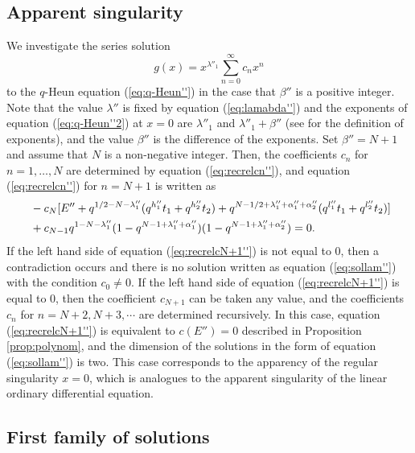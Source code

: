 \documentclass[12pt]{amsart}
\numberwithin{equation}{section}
\theoremstyle{definition}
\theoremstyle{remark}
\begin{document}
\subsection{Apparent singularity} \label{sec:appsing}
We investigate the series solution
\begin{equation}
g(x) = x^{\lambda ''_{1}} \sum_{n =0}^{\infty } c_{n} x^{n}  \label{eq:sollam''}
\end{equation}
to the $q$-Heun equation (\ref{eq:q-Heun''}) in the case that $\beta '' $ is a positive integer.
Note that the value $\lambda ''$ is fixed by equation (\ref{eq:lamabda''}) and the exponents of equation (\ref{eq:q-Heun''2}) at $x=0$ are $\lambda ''_{1} $ and $\lambda ''_{1} +\beta ''$ (see \cite{TakqH} for the definition of exponents), and the value $\beta ''  $ is the difference of the exponents.
Set $\beta '' =N+1$ and assume that $N$ is a non-negative integer.
Then, the coefficients $c_n$ for $n=1,\dots ,N$ are determined by equation (\ref{eq:recrelcn''}), and equation (\ref{eq:recrelcn''}) for $n=N+1$ is written as 
\begin{align}
 & \ - c_{N} [E'' + q^{1/2- N - \lambda ''_{1} } (q^{h''_{1}}t_{1} + q^{h''_{2}}t_{2} ) + q^{N - 1/2 + \lambda ''_{1} + \alpha ''_{1} + \alpha ''_{2} }( q^{l''_{1}}t_{1} + q^{l''_{2}}t_{2} ) ] \label{eq:recrelcN+1''} \\
 & \ + c_{N - 1} q^{ 1- N - \lambda ''_{1} } (1 - q^{N - 1 + \lambda ''_{1} + \alpha ''_{1} })(1 - q^{N - 1 + \lambda ''_{1} + \alpha ''_{2} }) = 0 . \notag
  \end{align}
If the left hand side of equation (\ref{eq:recrelcN+1''}) is not equal to $0$, then a contradiction occurs and there is no solution written as equation (\ref{eq:sollam''}) with the condition $c_0 \neq 0$.
If the left hand side of equation (\ref{eq:recrelcN+1''}) is equal to $0$, then the coefficient $c_{N+1}$ can be taken any value, and the coefficients $c_n$ for $n=N+2,N+3, \cdots $ are determined recursively.
In this case, equation (\ref{eq:recrelcN+1''}) is equivalent to $c (E'') = 0$ described in Proposition \ref{prop:polynom}, and the dimension of the solutions in the form of equation (\ref{eq:sollam''}) is two.
This case corresponds to the apparency of the regular singularity $x=0$, which is analogues to the apparent singularity of the linear ordinary differential equation.

\subsection{First family of solutions} \label{sec:1sol}
\end{document}

